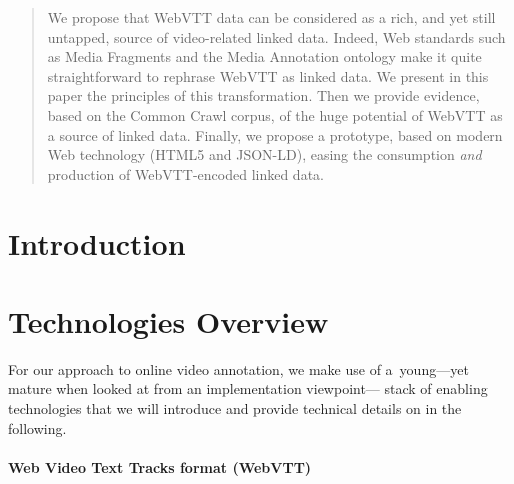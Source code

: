 \documentclass{sig-alternate}
\begin{document}
\maketitle
\begin{abstract}
We propose that WebVTT data can be considered as a rich, and yet still untapped, source of video-related linked data. Indeed, Web standards such as Media Fragments and the Media Annotation ontology make it quite straightforward to rephrase WebVTT as linked data. We present in this paper the principles of this transformation. Then we provide evidence, based on the Common Crawl corpus, of the huge potential of WebVTT as a source of linked data. Finally, we propose a prototype, based on modern Web technology (HTML5 and JSON-LD), easing the consumption \emph{and} production of WebVTT-encoded linked data.

\end{abstract}




\section{Introduction}

\cite{pfeiffer2013webvtt}

\section{Technologies Overview}

For our approach to online video annotation,
we make use of a~young---yet mature
when looked at from an implementation viewpoint---%
stack of enabling technologies that we will introduce
and provide technical details on in the following.

\paragraph{Web Video Text Tracks format (WebVTT)}
\end{document}
